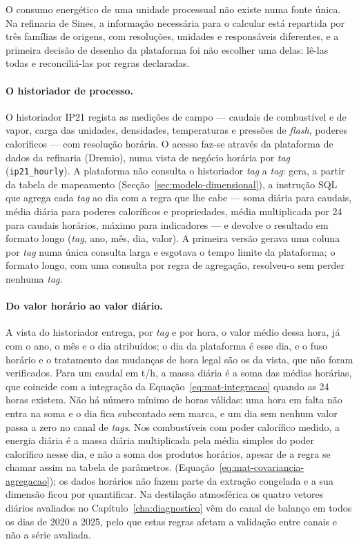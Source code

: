 O consumo energético de uma unidade processual não existe numa fonte
única. Na refinaria de Sines, a informação necessária para o calcular está
repartida por três famílias de origens, com resoluções, unidades e
responsáveis diferentes, e a primeira decisão de desenho da plataforma foi
não escolher uma delas: lê-las todas e reconciliá-las por regras
declaradas.

\paragraph{O historiador de processo.} O historiador IP21 regista as
medições de campo --- caudais de combustível e de vapor, carga das
unidades, densidades, temperaturas e pressões de \emph{flash}, poderes
caloríficos --- com resolução horária. O acesso faz-se através da
plataforma de dados da refinaria (Dremio), numa vista de negócio horária
por \emph{tag} (\texttt{ip21\_hourly}). A plataforma não consulta o
historiador \emph{tag} a \emph{tag}: gera, a partir da tabela de mapeamento
(Secção~\ref{sec:modelo-dimensional}), a instrução SQL que agrega cada
\emph{tag} ao dia com a regra que lhe cabe --- soma diária para caudais,
média diária para poderes caloríficos e propriedades, média multiplicada
por 24 para caudais horários, máximo para indicadores --- e devolve o
resultado em formato longo (\emph{tag}, ano, mês, dia, valor). A primeira
versão gerava uma coluna por \emph{tag} numa única consulta larga e
esgotava o tempo limite da plataforma; o formato longo, com uma consulta
por regra de agregação, resolveu-o sem perder nenhuma \emph{tag}.

\paragraph{Do valor horário ao valor diário.} A vista do historiador
entrega, por \emph{tag} e por hora, o valor médio dessa hora, já com o ano, o
mês e o dia atribuídos; o dia da plataforma é esse dia, e o fuso horário e
o tratamento das mudanças de hora legal são os da vista, que não foram
verificados. Para um caudal em t/h, a massa diária é a soma das médias
horárias, que coincide com a integração da
Equação~\eqref{eq:mat-integracao} quando as 24 horas existem. Não há número
mínimo de horas válidas: uma hora em falta não entra na soma e o dia fica
subcontado sem marca, e um dia sem nenhum valor passa a zero no canal de
\emph{tags}. Nos combustíveis com poder calorífico medido, a energia diária
é a massa diária multiplicada pela média simples do poder calorífico nesse
dia, e não a soma dos produtos horários, apesar de a regra se chamar assim
na tabela de parâmetros. 
(Equação~\eqref{eq:mat-covariancia-agregacao}); os dados horários não fazem
parte da extração congelada e a sua dimensão ficou por quantificar. Na
destilação atmosférica os quatro vetores diários avaliados no
Capítulo~\ref{cha:diagnostico} vêm do canal de balanço em todos os dias de
2020 a 2025, pelo que estas regras afetam a validação entre canais e não a
série avaliada.

